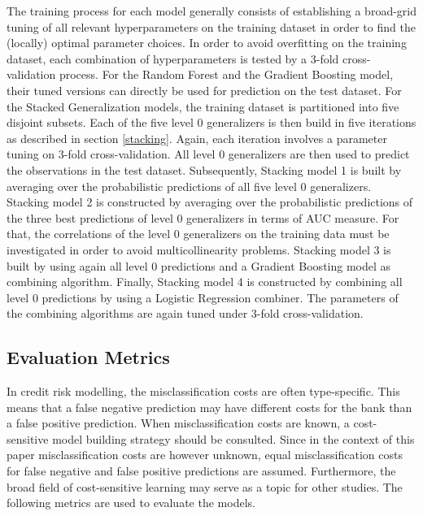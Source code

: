\documentclass[12pt]{article}
\begin{document}
The training process for each model generally consists of establishing a broad-grid tuning of all relevant hyperparameters on the training dataset in order to find the (locally) optimal parameter choices. In order to avoid overfitting on the training dataset, each combination of hyperparameters is tested by a 3-fold cross-validation process. For the Random Forest and the Gradient Boosting model, their tuned versions can directly be used for prediction on the test dataset. For the Stacked Generalization models, the training dataset is partitioned into five disjoint subsets. Each of the five level 0 generalizers is then build in five iterations as described in section \ref{stacking}. Again, each iteration involves a parameter tuning on 3-fold cross-validation. All level 0 generalizers are then used to predict the observations in the test dataset. Subsequently, Stacking model 1 is built by averaging over the probabilistic predictions of all five level 0 generalizers. Stacking model 2 is constructed by averaging over the probabilistic predictions of the three best predictions of level 0 generalizers in terms of AUC measure. For that, the correlations of the level 0 generalizers on the training data must be investigated in order to avoid multicollinearity problems. Stacking model 3 is built by using again all level 0 predictions and a Gradient Boosting model as combining algorithm. Finally, Stacking model 4 is constructed by combining all level 0 predictions by using a Logistic Regression combiner. The parameters of the combining algorithms are again tuned under 3-fold cross-validation.

\subsection{Evaluation Metrics}\label{metrics}
In credit risk modelling, the misclassification costs are often type-specific. This means that a false negative prediction may have different costs for the bank than a false positive prediction. When misclassification costs are known, a cost-sensitive model building strategy should be consulted. Since in the context of this paper misclassification costs are however unknown, equal misclassification costs for false negative and false positive predictions are assumed. Furthermore, the broad field of cost-sensitive learning may serve as a topic for other studies. The following metrics are used to evaluate the models.
\end{document}
